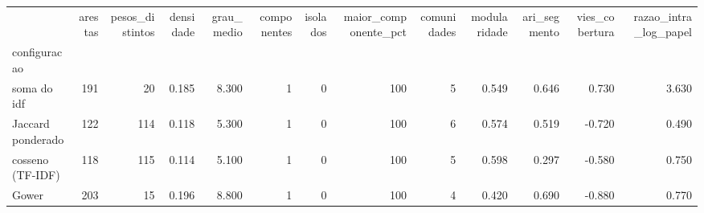 \begin{tabular}{lrrrrrrrrrrrr}
\toprule
 & arestas & pesos\_distintos & densidade & grau\_medio & componentes & isolados & maior\_componente\_pct & comunidades & modularidade & ari\_segmento & vies\_cobertura & razao\_intra\_log\_papel \\
configuracao &  &  &  &  &  &  &  &  &  &  &  &  \\
\midrule
soma do idf & 191 & 20 & 0.185 & 8.300 & 1 & 0 & 100 & 5 & 0.549 & 0.646 & 0.730 & 3.630 \\
Jaccard ponderado & 122 & 114 & 0.118 & 5.300 & 1 & 0 & 100 & 6 & 0.574 & 0.519 & -0.720 & 0.490 \\
cosseno (TF-IDF) & 118 & 115 & 0.114 & 5.100 & 1 & 0 & 100 & 5 & 0.598 & 0.297 & -0.580 & 0.750 \\
Gower & 203 & 15 & 0.196 & 8.800 & 1 & 0 & 100 & 4 & 0.420 & 0.690 & -0.880 & 0.770 \\
\bottomrule
\end{tabular}
